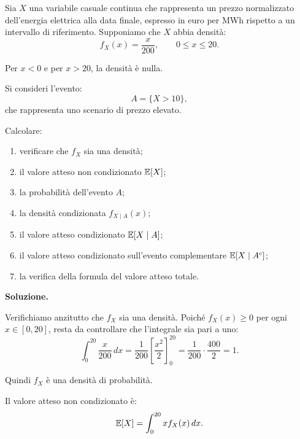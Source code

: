 \begin{exercise}
\label{ex:cap3-valore-atteso-condizionato-continuo}
\par\smallskip

Sia $X$ una variabile casuale continua che rappresenta un prezzo normalizzato
dell'energia elettrica alla data finale, espresso in euro per MWh rispetto a
un intervallo di riferimento. Supponiamo che $X$ abbia densit\`{a}:
\[
f_X(x)
=
\frac{x}{200},
\qquad
0\leq x\leq 20.
\]

Per $x<0$ e per $x>20$, la densit\`{a} \`{e} nulla.

Si consideri l'evento:
\[
A=\{X>10\},
\]
che rappresenta uno scenario di prezzo elevato.

Calcolare:

\begin{enumerate}
    \item verificare che $f_X$ sia una densit\`{a};

    \item il valore atteso non condizionato $\mathbb{E}[X]$;

    \item la probabilit\`{a} dell'evento $A$;

    \item la densit\`{a} condizionata $f_{X\mid A}(x)$;

    \item il valore atteso condizionato $\mathbb{E}[X\mid A]$;

    \item il valore atteso condizionato sull'evento complementare
    $\mathbb{E}[X\mid A^c]$;

    \item la verifica della formula del valore atteso totale.
\end{enumerate}

\medskip

\end{exercise}

\noindent
\textbf{Soluzione.}

Verifichiamo anzitutto che $f_X$ sia una densit\`{a}. Poich\'{e} $f_X(x)\geq 0$
per ogni $x\in[0,20]$, resta da controllare che l'integrale sia pari a uno:
\[
\int_{0}^{20}
\frac{x}{200}\,dx
=
\frac{1}{200}
\left[
\frac{x^2}{2}
\right]_{0}^{20}
=
\frac{1}{200}\cdot\frac{400}{2}
=
1.
\]

Quindi $f_X$ \`{e} una densit\`{a} di probabilit\`{a}.

Il valore atteso non condizionato \`{e}:
\[
\mathbb{E}[X]
=
\int_{0}^{20}
x f_X(x)\,dx.
\]

